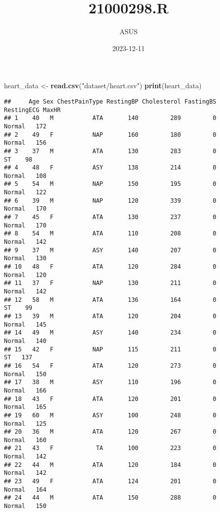 \documentclass[
]{article}
\title{21000298.R}
\author{ASUS}
\date{2023-12-11}
\newenvironment{Shaded}{\begin{snugshade}}{\end{snugshade}}
\newcommand{\FunctionTok}[1]{\textcolor[rgb]{0.13,0.29,0.53}{\textbf{#1}}}
\newcommand{\NormalTok}[1]{#1}
\newcommand{\OtherTok}[1]{\textcolor[rgb]{0.56,0.35,0.01}{#1}}
\newcommand{\StringTok}[1]{\textcolor[rgb]{0.31,0.60,0.02}{#1}}
\begin{document}
\maketitle

\begin{Shaded}
\begin{Highlighting}[]
\NormalTok{heart\_data }\OtherTok{\textless{}{-}} \FunctionTok{read.csv}\NormalTok{(}\StringTok{"dataset/heart.csv"}\NormalTok{)}
\FunctionTok{print}\NormalTok{(heart\_data)}
\end{Highlighting}
\end{Shaded}

\begin{verbatim}
##     Age Sex ChestPainType RestingBP Cholesterol FastingBS RestingECG MaxHR
## 1    40   M           ATA       140         289         0     Normal   172
## 2    49   F           NAP       160         180         0     Normal   156
## 3    37   M           ATA       130         283         0         ST    98
## 4    48   F           ASY       138         214         0     Normal   108
## 5    54   M           NAP       150         195         0     Normal   122
## 6    39   M           NAP       120         339         0     Normal   170
## 7    45   F           ATA       130         237         0     Normal   170
## 8    54   M           ATA       110         208         0     Normal   142
## 9    37   M           ASY       140         207         0     Normal   130
## 10   48   F           ATA       120         284         0     Normal   120
## 11   37   F           NAP       130         211         0     Normal   142
## 12   58   M           ATA       136         164         0         ST    99
## 13   39   M           ATA       120         204         0     Normal   145
## 14   49   M           ASY       140         234         0     Normal   140
## 15   42   F           NAP       115         211         0         ST   137
## 16   54   F           ATA       120         273         0     Normal   150
## 17   38   M           ASY       110         196         0     Normal   166
## 18   43   F           ATA       120         201         0     Normal   165
## 19   60   M           ASY       100         248         0     Normal   125
## 20   36   M           ATA       120         267         0     Normal   160
## 21   43   F            TA       100         223         0     Normal   142
## 22   44   M           ATA       120         184         0     Normal   142
## 23   49   F           ATA       124         201         0     Normal   164
## 24   44   M           ATA       150         288         0     Normal   150

\end{verbatim}
\end{document}
